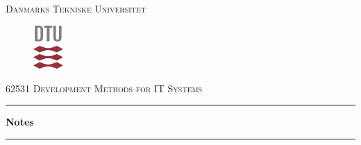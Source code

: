 \begin{titlepage}
\begin{center}
\textsc{\LARGE Danmarks Tekniske Universitet}\\[0.5cm]
\begin{figure}[h]
\centering
\includegraphics[width=0.1\textwidth]{Billeder/DTU-logo.png}~\\[0.1cm]
\end{figure}
\textsc{\LARGE 62531 Development Methods for IT Systems}\\[0.5cm]
\hrule
\vspace{0.3cm}
{\huge\bfseries Notes \\[0.3cm]}
\hrule
\center{ \today}


\end{center}




\end{titlepage}
